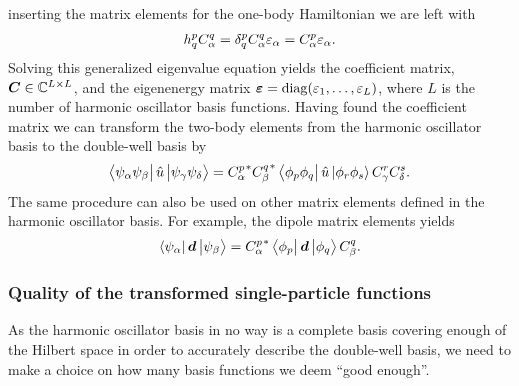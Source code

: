         inserting the matrix elements for the one-body Hamiltonian we are left
        with
        \begin{align}
            h^{p}_{q} C^{q}_{\alpha}
            = \delta^{p}_{q} C^{q}_{\alpha} \varepsilon_{\alpha}
            = C^{p}_{\alpha} \varepsilon_{\alpha}.
        \end{align}
        Solving this generalized eigenvalue equation yields the coefficient
        matrix, $\boldsymbol{C} \in \mathbb{C}^{L\times L}$, and the eigenenergy matrix
        $\boldsymbol{\varepsilon} = \operatorname{diag}(\varepsilon_1, \dots, \varepsilon_L)$, where
        $L$ is the number of harmonic oscillator basis functions.
        Having found the coefficient matrix we can transform the two-body
        elements from the harmonic oscillator basis to the double-well basis by
        \begin{align}
            \bra{\psi_{\alpha} \psi_{\beta}}
            \hat{u}
            \ket{\psi_{\gamma} \psi_{\delta}}
            = {C^{p}_{\alpha}}^{*}
            {C^{q}_{\beta}}^{*}
            \bra{\phi_{p} \phi_{q}}
            \hat{u}
            \ket{\phi_{r} \phi_{s}}
            C^{r}_{\gamma}
            C^{s}_{\delta}.
        \end{align}
        The same procedure can also be used on other matrix elements defined in
        the harmonic oscillator basis. For example, the dipole matrix elements
        yields
        \begin{align}
            \bra{\psi_{\alpha}}
            \boldsymbol{d}
            \ket{\psi_{\beta}}
            = {C^{p}_{\alpha}}^{*}
            \bra{\phi_{p}}
            \boldsymbol{d}
            \ket{\phi_{q}}
            C^{q}_{\beta}.
        \end{align}

        \subsubsection{Quality of the transformed single-particle functions}
            As the harmonic oscillator basis in no way is a complete basis
            covering enough of the Hilbert space in order to accurately describe
            the double-well basis, we need to make a choice on how many basis
            functions we deem ``good enough''.

